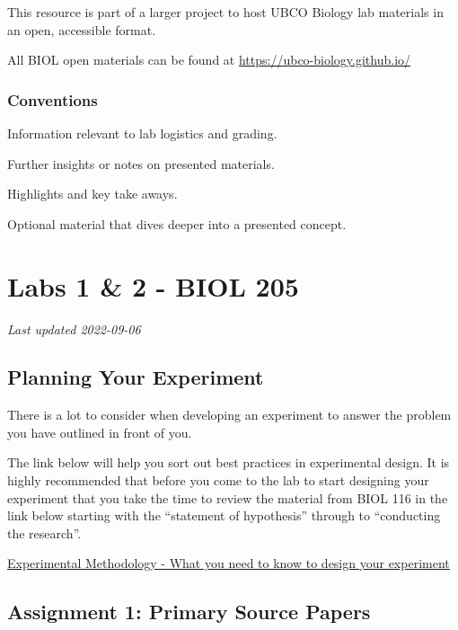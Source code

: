 \documentclass[
]{book}
\begin{document}
This resource is part of a larger project to host UBCO Biology lab materials in an open, accessible format.

All BIOL open materials can be found at \url{https://ubco-biology.github.io/}

\hypertarget{conventions}{%
\section*{Conventions}\label{conventions}}

Information relevant to lab logistics and grading.

Further insights or notes on presented materials.

Highlights and key take aways.

Optional material that dives deeper into a presented concept.

\hypertarget{part-labs-1-2---biol-205}{%
\part*{Labs 1 \& 2 - BIOL 205}\label{part-labs-1-2---biol-205}}

\emph{Last updated 2022-09-06}

\hypertarget{planning-your-experiment}{%
\chapter*{Planning Your Experiment}\label{planning-your-experiment}}

There is a lot to consider when developing an experiment to answer the problem you have outlined in front of you.

The link below will help you sort out best practices in experimental design. It is highly recommended that before you come to the lab to start designing your experiment that you take the time to review the material from BIOL 116 in the link below starting with the ``statement of hypothesis'' through to ``conducting the research''.

\href{https://ubco-biology.github.io/BIOL-116-Lab-Manual/statement-of-hypothesis.html}{Experimental Methodology - What you need to know to design your experiment}

\hypertarget{assignment-1-primary-source-papers}{%
\chapter*{Assignment 1: Primary Source Papers}\label{assignment-1-primary-source-papers}}
\end{document}

